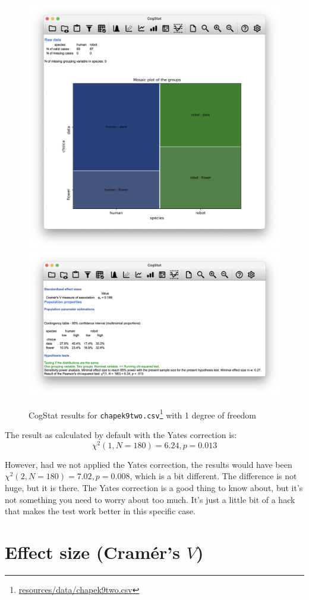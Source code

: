 \documentclass[
  11pt,
  a4paper,
  twoside,symmetric,openright]{book}
\theoremstyle{break}
\theoremstyle{break}
\DeclareRobustCommand{\href}[2]{#2\footnote{\url{#1}}}
\begin{document}
\begin{figure}

{\centering \includegraphics[width=0.6\linewidth]{resources/image/cogstatchapek9twomatrix} \includegraphics[width=0.6\linewidth]{resources/image/cogstatchapek9tworesult} 

}

\caption{CogStat results for \href{resources/data/chapek9two.csv}{\texttt{chapek9two.csv}} with 1 degree of freedom}\label{fig:chapek9two}
\end{figure}

The result as calculated by default with the Yates correction is:
\[
\chi^2(1, N = 180) = 6.24, p = 0.013
\]

However, had we not applied the Yates correction, the results would have been \(\chi^2(2, N = 180) = 7.02, p = 0.008\), which is a bit different. The difference is not huge, but it is there. The Yates correction is a good thing to know about, but it's not something you need to worry about too much. It's just a little bit of a hack that makes the test work better in this specific case.

\section{\texorpdfstring{Effect size (Cramér's \(V\))}{Effect size (Cramér's V)}}\label{chisqeffectsize}
\end{document}
